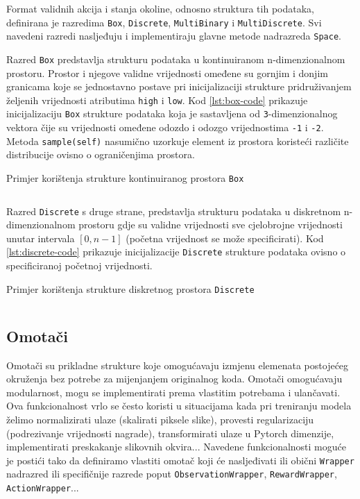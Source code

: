 Format validnih akcija i stanja okoline, odnosno struktura tih podataka, definirana je razredima \texttt{Box}, \texttt{Discrete}, \texttt{MultiBinary} i \texttt{MultiDiscrete}. Svi navedeni razredi nasljeđuju i implementiraju glavne metode nadrazreda \texttt{Space}. 

Razred \texttt{Box} predstavlja strukturu podataka u kontinuiranom n-dimenzionalnom prostoru. Prostor i njegove validne vrijednosti omeđene su gornjim i donjim granicama koje se jednostavno postave pri inicijalizaciji strukture pridruživanjem željenih vrijednosti atributima \texttt{high} i \texttt{low}. Kod \ref{lst:box-code} prikazuje inicijalizaciju \texttt{Box} strukture podataka koja je sastavljena od \texttt{3}-dimenzionalnog vektora čije su vrijednosti omeđene odozdo i odozgo vrijednostima \texttt{-1} i \texttt{-2}. Metoda \texttt{sample(self)} nasumično uzorkuje element iz prostora koristeći različite distribucije ovisno o ograničenjima prostora.

\begin{listing}[H]
    \caption{Primjer korištenja strukture kontinuiranog prostora \texttt{Box}}
    \inputminted{python}{snippets/box.txt}
    \label{lst:box-code}
\end{listing}

Razred \texttt{Discrete} s druge strane, predstavlja strukturu podataka u diskretnom n-dimenzionalnom prostoru gdje su validne vrijednosti sve cjelobrojne vrijednosti unutar intervala $[0, n-1]$ (početna vrijednost se može specificirati). Kod \ref{lst:discrete-code} prikazuje inicijalizacije \texttt{Discrete} strukture podataka ovisno o specificiranoj početnoj vrijednosti.

\begin{listing}[H]
    \caption{Primjer korištenja strukture diskretnog prostora \texttt{Discrete}}
    \inputminted{python}{snippets/discrete.txt}
    \label{lst:discrete-code}
\end{listing}

\subsection{Omotači}

Omotači  su prikladne strukture koje omogućavaju izmjenu elemenata postojećeg okruženja bez potrebe za mijenjanjem originalnog koda. Omotači omogućavaju modularnost, mogu se implementirati prema vlastitim potrebama i ulančavati. Ova funkcionalnost vrlo se često koristi u situacijama kada pri treniranju modela želimo normalizirati ulaze (skalirati piksele slike), provesti regularizaciju (podrezivanje vrijednosti nagrade), transformirati ulaze u Pytorch dimenzije, implementirati preskakanje slikovnih okvira...  Navedene funkcionalnosti moguće je postići tako da definiramo vlastiti omotač koji će nasljeđivati ili obični \texttt{Wrapper} nadrazred ili specifičnije razrede poput \texttt{ObservationWrapper}, \texttt{RewardWrapper}, \texttt{ActionWrapper}...

